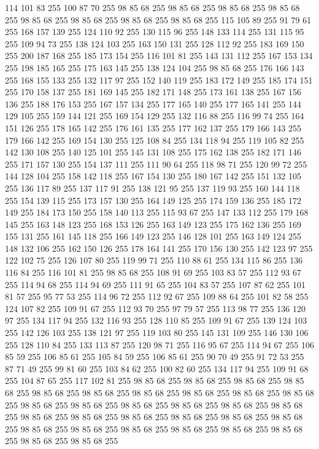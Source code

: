 114 101 83 255 100 87 70 255 98 85 68 255 98 85 68 255 98 85 68 255 98 85 68 255 98 85 68 255 98 85 68 255 98 85 68 255 98 85 68 255 115 105 89 255 91 79 61 255 168 157 139 255 124 110 92 255 130 115 96 255 148 133 114 255 131 115 95 255 109 94 73 255 138 124 103 255 163 150 131 255 128 112 92 255 183 169 150 255 200 187 168 255 185 173 154 255 116 101 81 255 143 131 112 255 167 153 134 255 198 185 165 255 175 163 145 255 138 124 104 255 98 85 68 255 176 166 143 255 168 155 133 255 132 117 97 255 152 140 119 255 183 172 149 255 185 174 151 255 170 158 137 255 181 169 145 255 182 171 148 255 173 161 138 255 167 156 136 255 188 176 153 255 167 157 134 255 177 165 140 255 177 165 141 255 144 129 105 255 159 144 121 255 169 154 129 255 132 116 88 255 116 99 74 255 164 151 126 255 178 165 142 255 176 161 135 255 177 162 137 255 179 166 143 255 179 166 142 255 169 154 130 255 125 108 84 255 134 118 94 255 119 105 82 255 142 130 108 255 140 125 101 255 145 131 108 255
175 162 138 255 182 171 146 255 171 157 130 255 154 137 111 255 111 90 64 255 118 98 71 255 120 99 72 255 144 128 104 255 158 142 118 255 167 154 130 255 180 167 142 255 151 132 105 255 136 117 89 255 137 117 91 255 138 121 95 255 137 119 93 255 160 144 118 255 154 139 115 255 173 157 130 255 164 149 125 255 174 159 136 255 185 172 149 255 184 173 150 255 158 140 113 255 115 93 67 255 147 133 112 255 179 168 145 255 163 148 123 255 168 153 126 255 163 149 123 255 175 162 136 255 169 155 131 255 161 145 118 255 166 149 123 255 146 128 101 255 163 149 124 255 148 132 106 255 162 150 126 255 178 164 141 255 170 156 130 255 142 123 97 255 122 102 75 255 126 107 80 255 119 99 71 255 110 88 61 255 134 115 86 255 136 116 84 255 116 101 81 255 98 85 68 255 108 91 69 255 103 83 57 255 112 93 67 255 114 94 68 255 114 94 69 255 111 91 65 255 104 83 57 255 107 87 62 255 101 81 57 255 95 77 53 255 114 96 72 255 112 92 67 255 109 88 64 255 101 82 58 255 124 107 82 255
109 91 67 255 112 93 70 255 97 79 57 255 113 98 77 255 136 120 97 255 134 117 94 255 132 116 93 255 128 110 85 255 109 91 67 255 139 124 103 255 142 126 103 255 138 121 97 255 119 103 80 255 145 131 109 255 146 130 106 255 128 110 84 255 133 113 87 255 120 98 71 255 116 95 67 255 114 94 67 255 106 85 59 255 106 85 61 255 105 84 59 255 106 85 61 255 90 70 49 255 91 72 53 255 87 71 49 255 99 81 60 255 103 84 62 255 100 82 60 255 134 117 94 255 109 91 68 255 104 87 65 255 117 102 81 255 98 85 68 255 98 85 68 255 98 85 68 255 98 85 68 255 98 85 68 255 98 85 68 255 98 85 68 255 98 85 68 255 98 85 68 255 98 85 68 255 98 85 68 255 98 85 68 255 98 85 68 255 98 85 68 255 98 85 68 255 98 85 68 255 98 85 68 255 98 85 68 255 98 85 68 255 98 85 68 255 98 85 68 255 98 85 68 255 98 85 68 255 98 85 68 255 98 85 68 255 98 85 68 255 98 85 68 255 98 85 68 255 98 85 68 255 98 85 68 255
